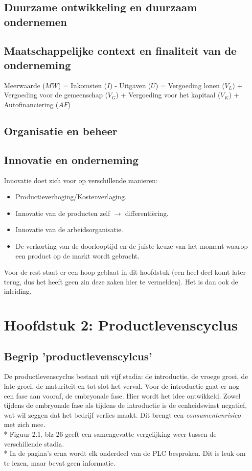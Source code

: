 \documentclass[12pt]{article}
\begin{document}
\subsection{Duurzame ontwikkeling en duurzaam ondernemen}
\subsection{Maatschappelijke context en finaliteit van de onderneming}
Meerwaarde ($MW$) = Inkomsten ($I$) - Uitgaven ($U$) = Vergoeding lonen ($V_L$) + Vergoeding voor de gemeenschap ($V_G$) + Vergoeding voor het kapitaal ($V_K$) + Autofinanciering ($AF$)
\subsection{Organisatie en beheer}
\subsection{Innovatie en onderneming}
Innovatie doet zich voor op verschillende manieren:
\begin{itemize}
\item Productieverhoging/Kostenverlaging.
\item Innovatie van de producten zelf $\rightarrow$ differenti\"ering.
\item Innovatie van de arbeidsorganisatie.
\item De verkorting van de doorlooptijd en de juiste keuze van het moment waarop een product op de markt wordt gebracht.
\end{itemize}
Voor de rest staat er een hoop geblaat in dit hoofdstuk (een heel deel komt later terug, dus het heeft geen zin deze zaken hier te vermelden). Het is dan ook de inleiding.
\clearpage
\section{Hoofdstuk 2: Productlevenscyclus}
\subsection{Begrip 'productlevenscylcus'}
De productlevenscyclus bestaat uit vijf stadia: de introductie, de vroege groei, de late groei, de maturiteit en tot slot het verval.
Voor de introductie gaat er nog een fase aan vooraf, de embryonale fase. Hier wordt het idee ontwikkeld. Zowel tijdens de embryonale fase als tijdens de introductie is de eenheidswinst negatief, wat wil zeggen dat het bedrijf verlies maakt. Dit brengt een \textit{consumentenrisico} met zich mee.\\*
Figuur 2.1, blz 26 geeft een samengevatte vergelijking weer tussen de verschillende stadia.\\*
In de pagina's erna wordt elk onderdeel van de PLC besproken. Dit is leuk om te lezen, maar bevat geen informatie.
\end{document}
